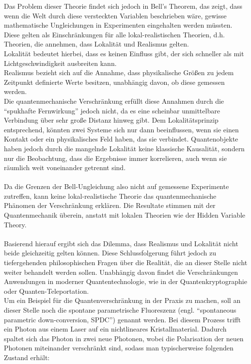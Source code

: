 Das Problem dieser Theorie findet sich jedoch in Bell's Theorem, das zeigt, dass wenn die Welt durch diese versteckten Variablen beschrieben wäre, gewisse mathematische Ungleichungen in Experimenten eingehalten werden müssten. 
Diese gelten als Einschränkungen für alle lokal-realistischen Theorien, d.h. Theorien, die annehmen, dass Lokalität und Realismus gelten. \\ 
Lokalität bedeutet hierbei, dass es keinen Einfluss gibt, der sich schneller als mit Lichtgeschwindigkeit ausbreiten kann. \\
Realismus bezieht sich auf die Annahme, dass physikalische Größen zu jedem Zeitpunkt definierte Werte besitzen, unabhängig davon, ob diese gemessen werden. \\

Die quantenmechanische Verschränkung erfüllt diese Annahmen durch die ``spukhafte Fernwirkung'' jedoch nicht, da es eine scheinbar unmittelbare Verbindung über sehr große Distanz hinweg gibt. Dem Lokalitätsprinzip entsprechend, könnten zwei Systeme sich nur dann beeinflussen, wenn sie einen Kontakt oder ein physikalisches Feld haben, das sie verbindet. Quantenobjekte haben jedoch durch die mangelnde Lokalität keine klassische Kausalität, sondern nur die Beobachtung, dass die Ergebnisse immer korrelieren, auch wenn sie räumlich weit voneinander getrennt sind.
\\ \\
Da die Grenzen der Bell-Ungleichung also nicht auf gemessene Experimente zutreffen, kann keine lokal-realistische Theorie das quantenmechanische Phänomen der Verschränkung erklären. Die Resultate stimmen mit der Quantenmechanik überein, anstatt mit lokalen Theorien wie der Hidden Variable Theory. 
\\ \\
Basierend hierauf ergibt sich das Dilemma, dass Realismus und Lokalität nicht beide gleichzeitig gelten können. Diese Schlussfolgerung führt jedoch zu tiefergehenden philosophischen Fragen über die Realität, die an dieser Stelle nicht weiter behandelt werden sollen. Unabhängig davon findet die Verschränkungen Anwendungen in moderner Quantentechnologie, wie in der Quantenkryptographie oder Quanten-Teleportation.  
\cite{homeister_quantum_2022-1}
\\

Um ein Beispiel für die Quantenverschränkung in der Praxis zu machen, soll an dieser Stelle noch  die spontane parametrische Fluoreszenz (engl. ``spontaneous parametric down-conversion, SPDC'') genannt werden. Bei diesem Prozess trifft ein Photon aus einem Laser auf ein nichtlineares Kristallmaterial. Dadurch spaltet sich das Photon in zwei neue Photonen, wobei die Polarisation der neuen Photonen miteinander verschränkt sind, sodass man typischerweise folgenden Zustand erhält:

